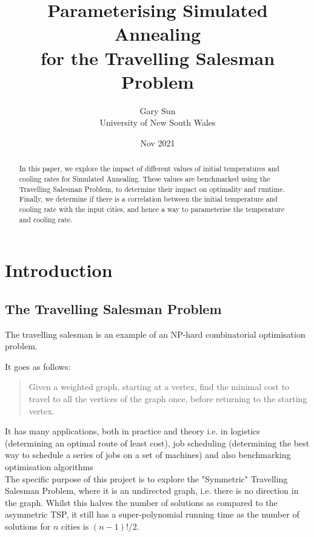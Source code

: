 \documentclass{article}
\title{
    Parameterising Simulated Annealing \\
    \large for the Travelling Salesman Problem
}
\author{
    Gary Sun \\
    \large University of New South Wales
}
\date{Nov 2021}
\begin{document}

\maketitle
\begin{abstract}
    \centering
    In this paper, we explore the impact of different values of initial temperatures and cooling rates for Simulated Annealing.
    These values are benchmarked using the Travelling Salesman Problem, to determine their impact on optimality and runtime. 
    Finally, we determine if there is a correlation between the initial temperature and cooling rate with the input cities, and hence a way to parameterise the temperature and cooling rate.
\end{abstract}
\tableofcontents
\restoregeometry

\newpage
\section{Introduction}
\subsection{The Travelling Salesman Problem}
The travelling salesman is an example of an NP-hard combinatorial optimisation problem.

It goes as follows:
\begin{quote}
Given a weighted graph, starting at a vertex, find the minimal cost to travel to all the vertices of the graph once, before returning to the starting vertex.
\end{quote}

It has many applications, both in practice and theory i.e. in logistics (determining an optimal route of least cost), job scheduling (determining the best way to schedule a series of jobs on a set of machines) and also benchmarking optimisation algorithms
\\

The specific purpose of this project is to explore the "Symmetric" Travelling Salesman Problem, where it is an undirected graph, i.e. there is no direction in the graph.
Whilst this halves the number of solutions as compared to the asymmetric TSP, it still has a super-polynomial running time as the number of solutions for $n$ cities is $(n - 1)! / 2$.
\end{document}
